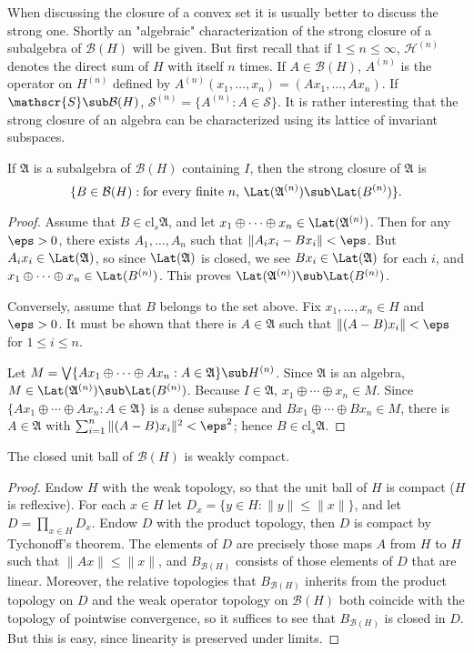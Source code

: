 When discussing the closure of a convex set it is usually better to discuss the strong one. Shortly an "algebraic" characterization of the strong closure of a subalgebra of $\mathcal{B}(H)$ will be given. But first recall that if $1\leq n\leq\infty$, $\mathcal{H}^{(n)}$ denotes the direct sum of $H$ with itself $n$ times. If $A\in\mathcal{B}(H)$, $A^{(n)}$ is the operator on $H^{(n)}$ defined by $A^{(n)}(x_1,\dots,x_n)=(Ax_1,\dots,Ax_n)$. If $\mathscr{S}\sub\mathcal{B}(H)$, $\mathscr{S}^{(n)}=\{A^{(n)}:A\in\mathscr{S}\}$. It is rather interesting that the strong closure of an algebra can be characterized using its lattice of invariant subspaces.
\begin{proposition}\label{Hilbert space subalgebra closure by invariant space}
If $\mathfrak{A}$ is a subalgebra of $\mathcal{B}(H)$ containing $I$, then the strong closure of $\mathfrak{A}$ is
\[\{B\in\mathcal{B}(H):\text{for every finite $n$, $\Lat(\mathfrak{A}^{(n)})\sub\Lat(B^{(n)})$}\}.\]
\end{proposition}
\begin{proof}
Assume that $B\in\mathrm{cl}_{s}\mathfrak{A}$, and let $x_1\oplus\cdots\oplus x_n\in\Lat(\mathfrak{A}^{(n)})$. Then for any $\eps>0$, there exists $A_1,\dots,A_n$ such that $\|A_ix_i-Bx_i\|<\eps$. But $A_ix_i\in\Lat(\mathfrak{A})$, so since $\Lat(\mathfrak{A})$ is closed, we see $Bx_i\in\Lat(\mathfrak{A})$ for each $i$, and $x_1\oplus\cdots\oplus x_n\in\Lat(B^{(n)})$. This proves $\Lat(\mathfrak{A}^{(n)})\sub\Lat(B^{(n)})$.\par
Conversely, assume that $B$ belongs to the set above. Fix $x_1,\dots,x_n\in H$ and $\eps>0$. It must be shown that there is $A\in\mathfrak{A}$ such that $\|(A-B)x_i\|<\eps$ for $1\leq i\leq n$.\par
Let $M=\bigvee\{Ax_1\oplus\dots\oplus Ax_n:A\in\mathfrak{A}\}\sub H^{(n)}$. Since $\mathfrak{A}$ is an algebra, $M\in\Lat(\mathfrak{A}^{(n)})\sub\Lat(B^{(n)})$. Because $I\in\mathfrak{A}$, $x_1\oplus\cdots\oplus x_n\in M$. Since $\{Ax_1\oplus\cdots\oplus Ax_n:A\in\mathfrak{A}\}$ is a dense subspace and $Bx_1\oplus\cdots\oplus Bx_n\in M$, there is $A\in\mathfrak{A}$ with $\sum_{i=1}^{n}\|(A-B)x_i\|^2<\eps^2$; hence $B\in\mathrm{cl}_s\mathfrak{A}$.
\end{proof}
\begin{proposition}
The closed unit ball of $\mathcal{B}(H)$ is weakly compact.
\end{proposition}
\begin{proof}
Endow $H$ with the weak topology, so that the unit ball of $H$ is compact ($H$ is reflexive). For each $x\in H$ let $D_x=\{y\in H:\|y\|\leq\|x\|\}$, and let $D=\prod_{x\in H}D_x$. Endow $D$ with the product topology, then $D$ is compact by Tychonoff's theorem. The elements of $D$ are precisely those maps $A$ from $H$ to $H$ such that $\|Ax\|\leq\|x\|$, and $B_{\mathcal{B}(H)}$ consists of those elements of $D$ that are linear.
Moreover, the relative topologies that $B_{\mathcal{B}(H)}$ inherits from the product topology on $D$ and the weak operator topology on $\mathcal{B}(H)$ both coincide with the topology of pointwise convergence, so it suffices to see that $B_{\mathcal{B}(H)}$ is closed in $D$. But this is easy, since linearity is preserved under limits.
\end{proof}
